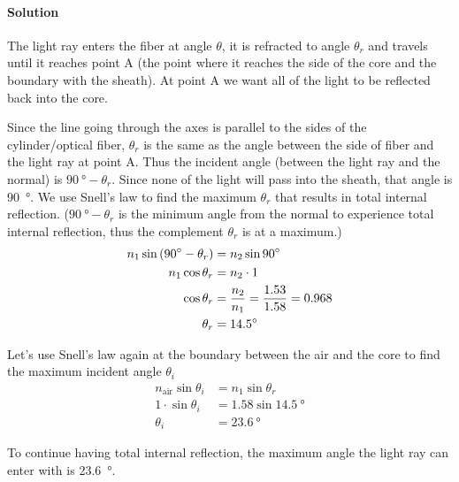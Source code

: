 \documentclass[12pt]{article}
\begin{document}
\paragraph{Solution}
The light ray enters the fiber at angle $\theta$, it is refracted to angle $\theta_r$ and travels until it reaches point A (the point where it reaches the side of the core and the boundary with the sheath).  At point A we want all of the light to be reflected back into the core.  

Since the line going through the axes is parallel to the sides of the cylinder/optical fiber, $\theta_r$ is the same as the angle between the side of fiber and the light ray at point A.  Thus the incident angle (between the light ray and the normal) is $\SI{90}{\degree}-\theta_r$.  Since none of the light will pass into the sheath, that angle is \SI{90}{\degree}.  We use Snell's law to find the maximum $\theta_r$ that results in total internal reflection.  ($\SI{90}{\degree}-\theta_r$ is the minimum angle from the normal to experience total internal reflection, thus the complement $\theta_r$ is at a maximum.)
\begin{align*}
	n_1 \sin \qty(\SI{90}{\degree} - \theta_r) &= n_2 \sin \SI{90}{\degree} \\
    n_1 \cos \theta_r &= n_2 \cdot 1 \\
    \cos \theta_r &= \frac{n_2}{n_1} = \frac{1.53}{1.58} = 0.968 \\
    \theta_r &= \SI{14.5}{\degree}
\end{align*}

Let's use Snell's law again at the boundary between the air and the core to find the maximum incident angle $\theta_i$
\begin{align*}
	n_\text{air} \sin \theta_i &= n_1 \sin \theta_r \\
    1 \cdot \sin \theta_i &= 1.58 \sin \SI{14.5}{\degree}\\
    \theta_i &= \boxed{ \SI{23.6}{\degree} }
\end{align*}

To continue having total internal reflection, the maximum angle the light ray can enter with is \SI{23.6}{\degree}.
\end{document}
